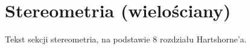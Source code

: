 \documentclass{greaseproof}
\begin{document}








\section{Stereometria (wielościany)}
Tekst sekcji stereometria, na podstawie 8 rozdziału Hartshorne'a.
























{}


\raggedright
{}
\printindex

\printindex[persons]
\end{document}
